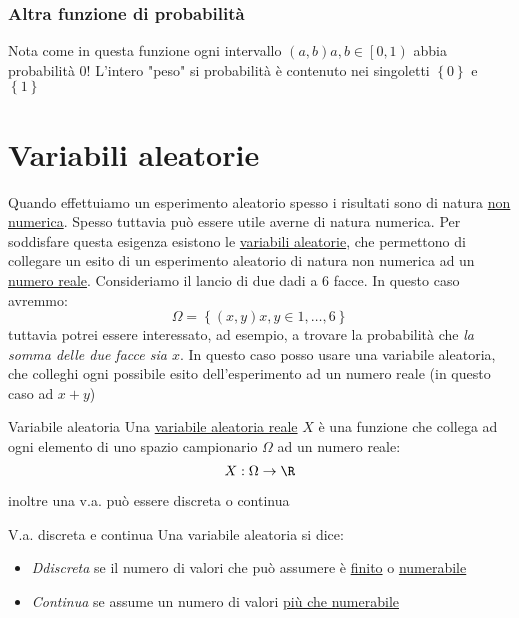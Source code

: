 	\subsubsection*{Altra funzione di probabilità }

	Nota come in questa funzione ogni intervallo $ \left(a,b\right) a,b \in \left[0,1\right)$ abbia probabilità 0! L'intero "peso" si probabilità è contenuto nei singoletti $ \left\{0\right\} $ e $ \left\{1\right\} $
\section{Variabili aleatorie}
Quando effettuiamo un esperimento aleatorio spesso i risultati sono di natura \underline{non numerica}. Spesso tuttavia può essere utile averne di natura numerica. Per soddisfare questa esigenza esistono le \underline{variabili aleatorie}, che permettono di collegare un esito di un esperimento aleatorio di natura non numerica ad un \underline{numero reale}.
Consideriamo il lancio di due dadi a 6 facce. In questo caso avremmo:
\[
	\Omega = \left\{\left(x, y\right) x,y \in 1,\ldots ,6\right\}
\]
tuttavia potrei essere interessato, ad esempio, a trovare la probabilità che \textit{la somma delle due facce sia $ x $}. In questo caso posso usare una variabile aleatoria, che colleghi ogni possibile esito dell'esperimento ad un numero reale (in questo caso ad $ x+y $)
\begin{definizione}{Variabile aleatoria}
	Una \underline{variabile aleatoria reale} $ X $ è una funzione che collega ad ogni elemento di uno spazio campionario $ \Omega $ ad un numero reale:
	\[
		X: \Omega \to \R
	\]
\end{definizione}
inoltre una v.a. può essere discreta o continua
\begin{definizione}{V.a. discreta e continua}
	Una variabile aleatoria si dice:
	\begin{itemize}
		\item \textit{Ddiscreta} se il numero di valori che può assumere è \underline{finito} o \underline{numerabile}
		\item \textit{Continua} se assume un numero di valori \underline{più che numerabile}
	\end{itemize}
\end{definizione}
